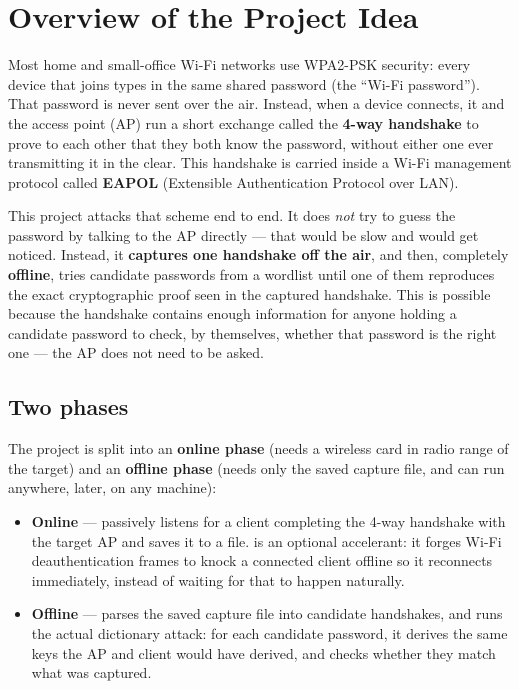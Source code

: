 \section{Overview of the Project Idea}

Most home and small-office Wi-Fi networks use WPA2-PSK security: every device that joins types in the same shared password (the ``Wi-Fi password''). That password is never sent over the air. Instead, when a device connects, it and the access point (AP) run a short exchange called the \textbf{4-way handshake} to prove to each other that they both know the password, without either one ever transmitting it in the clear. This handshake is carried inside a Wi-Fi management protocol called \textbf{EAPOL} (Extensible Authentication Protocol over LAN).

This project attacks that scheme end to end. It does \emph{not} try to guess the password by talking to the AP directly --- that would be slow and would get noticed. Instead, it \textbf{captures one handshake off the air}, and then, completely \textbf{offline}, tries candidate passwords from a wordlist until one of them reproduces the exact cryptographic proof seen in the captured handshake. This is possible because the handshake contains enough information for anyone holding a candidate password to check, by themselves, whether that password is the right one --- the AP does not need to be asked.

\subsection{Two phases}
The project is split into an \textbf{online phase} (needs a wireless card in radio range of the target) and an \textbf{offline phase} (needs only the saved capture file, and can run anywhere, later, on any machine):

\begin{itemize}
\item \textbf{Online} ---  passively listens for a client completing the 4-way handshake with the target AP and saves it to a file.  is an optional accelerant: it forges Wi-Fi deauthentication frames to knock a connected client offline so it reconnects immediately, instead of waiting for that to happen naturally.
\item \textbf{Offline} ---  parses the saved capture file into candidate handshakes, and  runs the actual dictionary attack: for each candidate password, it derives the same keys the AP and client would have derived, and checks whether they match what was captured.
\end{itemize}

